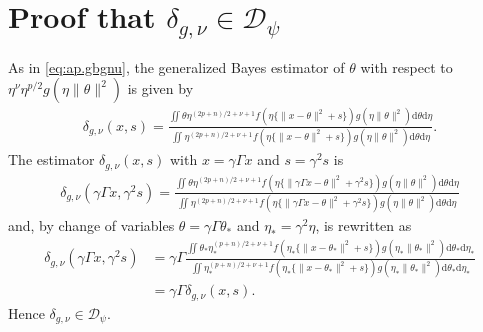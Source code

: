 \documentclass[preprint,11pt]{imsart}
\numberwithin{equation}{section}
\theoremstyle{plain}
\theoremstyle{definition}
\theoremstyle{remark}
\newcommand{\rd}{\mathrm{d}}
\begin{document}
\section{Proof that $\delta_{g,\nu}\in\mathcal{D}_\psi$}
\label{sec:ap.nu.neq.-1}
As in \eqref{eq:ap.gbgnu},
the generalized Bayes estimator of $\theta$ with respect to %
$ \eta^\nu\eta^{p/2}g(\eta\|\theta\|^2)$ is given by
\begin{align*}
  \delta_{g,\nu}(x,s)=\frac{\iint \theta \eta^{(2p+n)/2+\nu+1}f(\eta\{\|x-\theta\|^2+s\})g(\eta\|\theta\|^2) \rd \theta  \rd \eta}
 {\iint  \eta^{(2p+n)/2+\nu+1}f(\eta\{\|x-\theta\|^2+s\})g(\eta\|\theta\|^2) \rd \theta  \rd \eta}.
\end{align*}
The estimator $  \delta_{g,\nu}(x,s)$ with $x=\gamma\Gamma x$ and $s=\gamma^2s$ is
\begin{align*}
 \delta_{g,\nu}(\gamma\Gamma x,\gamma^2s)
 =
\frac{\iint \theta \eta^{(2p+n)/2+\nu+1}f(\eta\{\|\gamma\Gamma x-\theta\|^2+\gamma^2 s\})g(\eta\|\theta\|^2) \rd \theta  \rd \eta}
 {\iint  \eta^{(2p+n)/2+\nu+1}f(\eta\{\|\gamma\Gamma x-\theta\|^2+\gamma^2 s\})g(\eta\|\theta\|^2) \rd \theta  \rd \eta}
\end{align*}
and, by change of variables $\theta=\gamma\Gamma \theta_*$ and $\eta_*=\gamma^2\eta$,
is rewritten as
\begin{align*}
 \delta_{g,\nu}(\gamma\Gamma x,\gamma^2s)
&=\gamma\Gamma\frac{\iint \theta_* \eta_*^{(p+n)/2+\nu+1}
 f(\eta_*\{\| x-\theta_*\|^2+ s\})g(\eta_*\|\theta_*\|^2) \rd \theta_*  \rd \eta_*}
 {\iint \eta_*^{(p+n)/2+\nu+1}f(\eta_*\{\| x-\theta_*\|^2+ s\})
 g(\eta_*\|\theta_*\|^2) \rd \theta_*  \rd \eta_*} \\
 &=\gamma\Gamma  \delta_{g,\nu}(x,s).
\end{align*}
Hence $\delta_{g,\nu}\in\mathcal{D}_\psi$.
\end{document}
